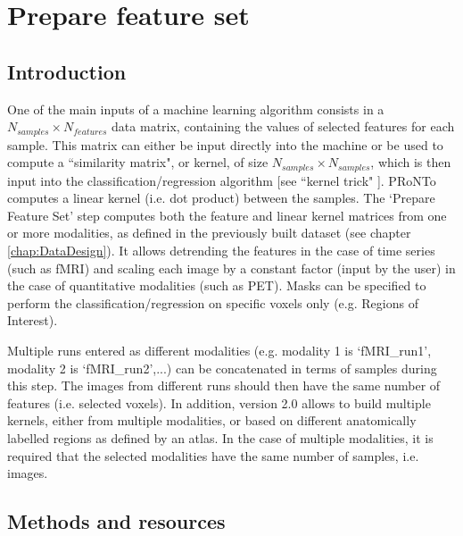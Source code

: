 %

\chapter{Prepare feature set}
\label{chap:PrepFeat}
\minitoc

\section{Introduction}
\label{sec:prep_intro}
One of the main inputs of a machine learning algorithm consists in a $N_{samples} \times N_{features}$ data matrix, containing the values of selected features for each sample. 
This matrix can either be input directly into the machine or be used to compute a ``similarity matrix", or kernel, of size $N_{samples} \times N_{samples}$, which is then input into the classification/regression algorithm [see ``kernel trick" \cite{Hofmann2008,Aizerman1964}]. PRoNTo computes a linear kernel (i.e. dot product) between the samples.
The `Prepare Feature Set' step computes both the feature and linear kernel matrices from one or more modalities, as defined in the previously built dataset (see chapter \ref{chap:DataDesign}). 
It allows detrending the features in the case of time series (such as fMRI) and scaling each image by a constant factor (input by the user) in the case of quantitative modalities (such as PET). Masks can be specified to perform the classification/regression on specific voxels only (e.g. Regions of Interest).

Multiple runs entered as different modalities (e.g. modality 1 is `fMRI\_run1', modality 2 is `fMRI\_run2',...) can be concatenated in terms of samples during this step. 
The images from different runs should then have the same number of features (i.e. selected voxels). In addition, version 2.0 allows to build multiple kernels, either from multiple modalities, or based on different anatomically labelled regions as defined by an atlas. In the case of multiple modalities, it is required that the selected modalities have the same number of samples, i.e. images. 

\section{Methods and resources}

